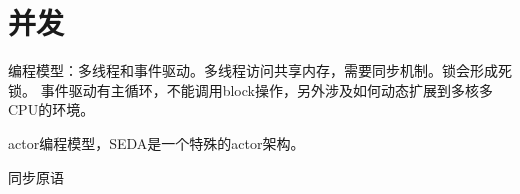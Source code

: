 \chapter{并发}

编程模型：多线程和事件驱动。多线程访问共享内存，需要同步机制。锁会形成死锁。
事件驱动有主循环，不能调用block操作，另外涉及如何动态扩展到多核多CPU的环境。

actor编程模型，SEDA是一个特殊的actor架构。

同步原语
